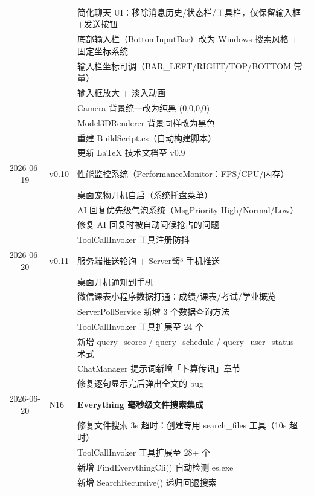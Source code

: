 \documentclass[12pt,a4paper]{ctexart}
\begin{document}
\begin{table}[H]
\begin{tabular}{cl>{\raggedright\arraybackslash}p{}}
           &      & 简化聊天 UI：移除消息历史/状态栏/工具栏，仅保留输入框+发送按钮\\
           &      & 底部输入栏（BottomInputBar）改为 Windows 搜索风格 + 固定坐标系统\\
           &      & 输入栏坐标可调（BAR\_LEFT/RIGHT/TOP/BOTTOM 常量）\\
           &      & 输入框放大 + 淡入动画\\
           &      & Camera 背景统一改为纯黑 (0,0,0,0)\\
           &      & Model3DRenderer 背景同样改为黑色\\
           &      & 重建 BuildScript.cs（自动构建脚本）\\
           &      & 更新 LaTeX 技术文档至 v0.9\\
2026-06-19 & v0.10 & 性能监控系统（PerformanceMonitor：FPS/CPU/内存）\\
           &       & 桌面宠物开机自启（系统托盘菜单）\\
           &       & AI 回复优先级气泡系统（MsgPriority High/Normal/Low）\\
           &       & 修复 AI 回复时被自动问候抢占的问题\\
           &       & ToolCallInvoker 工具注册防抖\\
2026-06-20 & v0.11 & 服务端推送轮询 + Server酱³ 手机推送\\
           &       & 桌面开机通知到手机\\
           &       & 微信课表小程序数据打通：成绩/课表/考试/学业概览\\
           &       & ServerPollService 新增 3 个数据查询方法\\
           &       & ToolCallInvoker 工具扩展至 24 个\\
           &       & 新增 query\_scores / query\_schedule / query\_user\_status 术式\\
           &       & ChatManager 提示词新增「卜算传讯」章节\\
           &       & 修复逐句显示完后弹出全文的 bug\\
2026-06-20 & N16  & \textbf{Everything 毫秒级文件搜索集成}\\
           &       & 修复文件搜索 3s 超时：创建专用 search\_files 工具（10s 超时）\\
           &       & ToolCallInvoker 工具扩展至 28+ 个\\
           &       & 新增 FindEverythingCli() 自动检测 es.exe\\
           &       & 新增 SearchRecursive() 递归回退搜索\\

\end{tabular}
\end{table}
\end{document}
